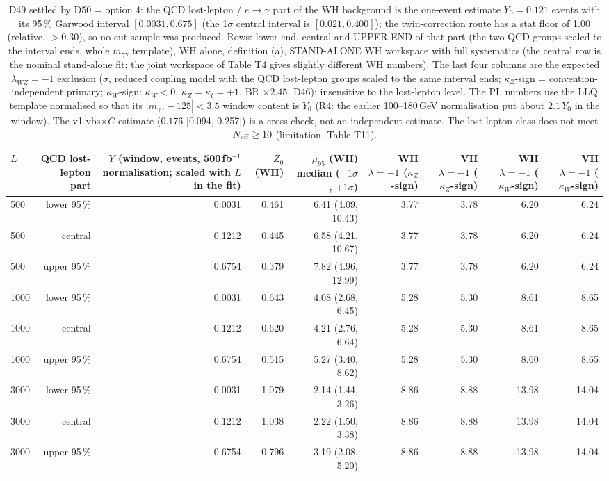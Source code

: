 \begin{table}[ht]\centering\small
\begin{tabular}{lrrrrrrrr}\hline
$L$ & QCD lost-lepton part & $Y$ (window, events, 500\,fb$^{-1}$ normalisation; scaled with $L$ in the fit) & $Z_0$ (WH) & $\mu_{95}$ (WH) median ($-1\sigma$, $+1\sigma$) & WH $\lambda{=}{-}1$ ($\kappa_Z$-sign) & VH $\lambda{=}{-}1$ ($\kappa_Z$-sign) & WH $\lambda{=}{-}1$ ($\kappa_W$-sign) & VH $\lambda{=}{-}1$ ($\kappa_W$-sign) \\\hline
500 & lower 95\,\% & 0.0031 & 0.461 & 6.41 (4.09, 10.43) & 3.77 & 3.78 & 6.20 & 6.24 \\
500 & central & 0.1212 & 0.445 & 6.58 (4.21, 10.67) & 3.77 & 3.78 & 6.20 & 6.24 \\
500 & upper 95\,\% & 0.6754 & 0.379 & 7.82 (4.96, 12.99) & 3.77 & 3.78 & 6.20 & 6.24 \\
1000 & lower 95\,\% & 0.0031 & 0.643 & 4.08 (2.68, 6.45) & 5.28 & 5.30 & 8.61 & 8.65 \\
1000 & central & 0.1212 & 0.620 & 4.21 (2.76, 6.64) & 5.28 & 5.30 & 8.61 & 8.65 \\
1000 & upper 95\,\% & 0.6754 & 0.515 & 5.27 (3.40, 8.62) & 5.28 & 5.30 & 8.60 & 8.65 \\
3000 & lower 95\,\% & 0.0031 & 1.079 & 2.14 (1.44, 3.26) & 8.86 & 8.88 & 13.98 & 14.04 \\
3000 & central & 0.1212 & 1.038 & 2.22 (1.50, 3.38) & 8.86 & 8.88 & 13.98 & 14.04 \\
3000 & upper 95\,\% & 0.6754 & 0.796 & 3.19 (2.08, 5.20) & 8.86 & 8.88 & 13.98 & 14.04 \\\hline
\end{tabular}
\caption{D49 settled by D50 = option 4: the QCD lost-lepton / $e\to\gamma$ part of the WH background is the one-event estimate $Y_0=0.121$ events with its 95\,\% Garwood interval $[0.0031,0.675]$ (the 1$\sigma$ central interval is $[0.021,0.400]$); the twin-correction route has a stat floor of 1.00 (relative, $>0.30$), so no cut sample was produced. Rows: lower end, central and UPPER END of that part (the two QCD groups scaled to the interval ends, whole $m_{\gamma\gamma}$ template), WH alone, definition (a), STAND-ALONE WH workspace with full systematics (the central row is the nominal stand-alone fit; the joint workspace of Table T4 gives slightly different WH numbers). The last four columns are the expected $\lambda_{WZ}{=}{-}1$ exclusion ($\sigma$, reduced coupling model with the QCD lost-lepton groups scaled to the same interval ends; $\kappa_Z$-sign = convention-independent primary; $\kappa_W$-sign: $\kappa_W{<}0$, $\kappa_Z{=}\kappa_t{=}{+}1$, BR $\times2.45$, D46): insensitive to the lost-lepton level. The PL numbers use the LLQ template normalised so that its $|m_{\gamma\gamma}-125|<3.5$ window content is $Y_0$ (R4: the earlier 100--180\,GeV normalisation put about $2.1\,Y_0$ in the window). The v1 vbs$\times C$ estimate ($0.176$ [0.094, 0.257]) is a cross-check, not an independent estimate. The lost-lepton class does not meet $N_{\rm eff}\ge10$ (limitation, Table T11).}
\end{table}
